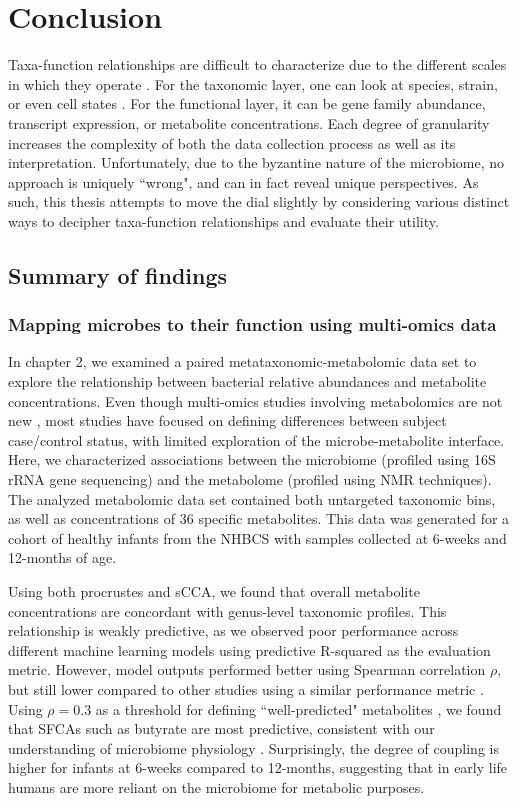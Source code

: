 \chapter{Conclusion}

Taxa-function relationships are difficult to characterize due to the different scales in which they operate \cite{langille2018exploring}. For the taxonomic layer, one can look at species, strain, or even cell states \cite{mcnulty2021dropletbased}. For the functional layer, it can be gene family abundance, transcript expression, or metabolite concentrations. Each degree of granularity increases the complexity of both the data collection process as well as its interpretation. Unfortunately, due to the byzantine nature of the microbiome, no approach is uniquely ``wrong", and can in fact reveal unique perspectives. As such, this thesis attempts to move the dial slightly by considering various distinct ways to decipher taxa-function relationships and evaluate their utility. 

\section{Summary of findings}
\subsection{Mapping microbes to their function using multi-omics data}

In chapter 2, we examined a paired metataxonomic-metabolomic data set to explore the relationship between bacterial relative abundances and metabolite concentrations. Even though multi-omics studies involving metabolomics are not new \cite{lloyd-price2019multiomics, ayeni2018infant, kisuse2018urban}, most studies have focused on defining differences between subject case/control status, with limited exploration of the microbe-metabolite interface. Here, we characterized associations between the microbiome (profiled using 16S rRNA gene sequencing) and the metabolome (profiled using NMR techniques). The analyzed metabolomic data set contained both untargeted taxonomic bins, as well as  concentrations of 36 specific metabolites. This data was generated for a cohort of healthy infants from the NHBCS with samples collected at 6-weeks and 12-months of age. 

Using both procrustes and sCCA, we found that overall metabolite concentrations are concordant with genus-level taxonomic profiles. This relationship is weakly predictive, as we observed poor performance across different machine learning models using predictive R-squared as the evaluation metric. However, model outputs performed better using Spearman correlation $\rho$, but still lower compared to other studies using a similar performance metric \cite{mallick2019predictive}. Using $\rho = 0.3$ as a threshold for defining ``well-predicted" metabolites \cite{mallick2019predictive, muller2021metaanalysis}, we found that SFCAs such as butyrate are most predictive, consistent with our understanding of microbiome physiology \cite{leblanc2017beneficial}. Surprisingly, the degree of coupling is higher for infants at 6-weeks compared to 12-months, suggesting that in early life humans are more reliant on the microbiome for metabolic purposes. 

